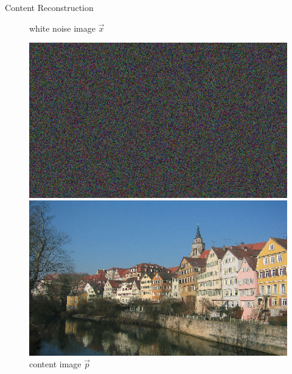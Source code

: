 \documentclass{beamer}
\begin{document}
\begin{frame}{Content Reconstruction}
\begin{figure}[ht]
    \begin{minipage}[b]{0.45\linewidth}
        \centering
        \caption{white noise image $\overrightarrow{x}$}
        \includegraphics[width=\textwidth]{img/content/noise.png}
    \end{minipage}
    \hspace{0.5cm}
    \begin{minipage}[b]{0.45\linewidth}
        \centering
        \caption{content image $\overrightarrow{p}$}
        \includegraphics[width=\textwidth]{img/content/tubingen.png}
    \end{minipage}
\end{figure}
\end{frame}
\end{document}
